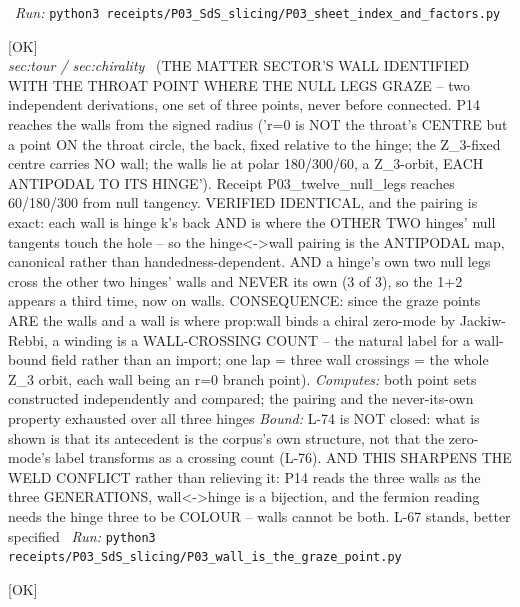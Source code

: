 \begin{description}
\ \emph{Run:} \texttt{python3 receipts/P03\_SdS\_slicing/P03\_sheet\_index\_and\_factors.py}
\item[\label{rcpt:P03_wall_is_the_graze_point}\texttt{P03\_wall\_is\_the\_graze\_point}]\hfill\textsf{[OK]}\\
\textit{sec:tour / sec:chirality} \ (THE MATTER SECTOR'S WALL IDENTIFIED WITH THE THROAT POINT WHERE THE NULL LEGS GRAZE -- two independent derivations, one set of three points, never before connected. P14 reaches the walls from the signed radius ('r=0 is NOT the throat's CENTRE but a point ON the throat circle, the back, fixed relative to the hinge; the Z\_3-fixed centre carries NO wall; the walls lie at polar 180/300/60, a Z\_3-orbit, EACH ANTIPODAL TO ITS HINGE'). Receipt P03\_twelve\_null\_legs reaches 60/180/300 from null tangency. VERIFIED IDENTICAL, and the pairing is exact: each wall is hinge k's back AND is where the OTHER TWO hinges' null tangents touch the hole -- so the hinge<->wall pairing is the ANTIPODAL map, canonical rather than handedness-dependent. AND a hinge's own two null legs cross the other two hinges' walls and NEVER its own (3 of 3), so the 1+2 appears a third time, now on walls. CONSEQUENCE: since the graze points ARE the walls and a wall is where prop:wall binds a chiral zero-mode by Jackiw-Rebbi, a winding is a WALL-CROSSING COUNT -- the natural label for a wall-bound field rather than an import; one lap = three wall crossings = the whole Z\_3 orbit, each wall being an r=0 branch point). 
\emph{Computes:} both point sets constructed independently and compared; the pairing and the never-its-own property exhausted over all three hinges
 \emph{Bound:} L-74 is NOT closed: what is shown is that its antecedent is the corpus's own structure, not that the zero-mode's label transforms as a crossing count (L-76). AND THIS SHARPENS THE WELD CONFLICT rather than relieving it: P14 reads the three walls as the three GENERATIONS, wall<->hinge is a bijection, and the fermion reading needs the hinge three to be COLOUR -- walls cannot be both. L-67 stands, better specified
\ \emph{Run:} \texttt{python3 receipts/P03\_SdS\_slicing/P03\_wall\_is\_the\_graze\_point.py}
\item[\label{rcpt:P03_thirds_from_closure}\texttt{P03\_thirds\_from\_closure}]\hfill\textsf{[OK]}\\

\end{description}
